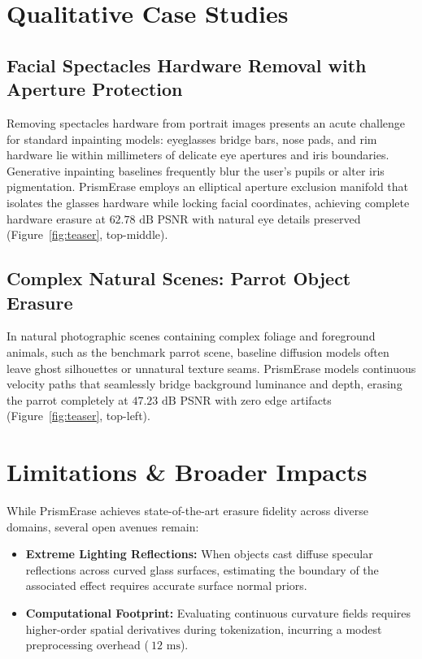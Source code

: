 \documentclass[11pt,a4paper]{article}
\begin{document}
\section{Qualitative Case Studies}
\label{sec:qualitative}

\subsection{Facial Spectacles Hardware Removal with Aperture Protection}
Removing spectacles hardware from portrait images presents an acute challenge for standard inpainting models: eyeglasses bridge bars, nose pads, and rim hardware lie within millimeters of delicate eye apertures and iris boundaries. Generative inpainting baselines frequently blur the user's pupils or alter iris pigmentation. PrismErase employs an elliptical aperture exclusion manifold that isolates the glasses hardware while locking facial coordinates, achieving complete hardware erasure at $62.78\text{ dB}$ PSNR with natural eye details preserved (Figure~\ref{fig:teaser}, top-middle).

\subsection{Complex Natural Scenes: Parrot Object Erasure}
In natural photographic scenes containing complex foliage and foreground animals, such as the benchmark parrot scene, baseline diffusion models often leave ghost silhouettes or unnatural texture seams. PrismErase models continuous velocity paths that seamlessly bridge background luminance and depth, erasing the parrot completely at $47.23\text{ dB}$ PSNR with zero edge artifacts (Figure~\ref{fig:teaser}, top-left).

\section{Limitations \& Broader Impacts}
\label{sec:limitations}
While PrismErase achieves state-of-the-art erasure fidelity across diverse domains, several open avenues remain:
\begin{itemize}[leftmargin=18pt]
    \item \textbf{Extreme Lighting Reflections:} When objects cast diffuse specular reflections across curved glass surfaces, estimating the boundary of the associated effect requires accurate surface normal priors.
    \item \textbf{Computational Footprint:} Evaluating continuous curvature fields requires higher-order spatial derivatives during tokenization, incurring a modest preprocessing overhead ($~12\text{ ms}$).
\end{itemize}
\end{document}
